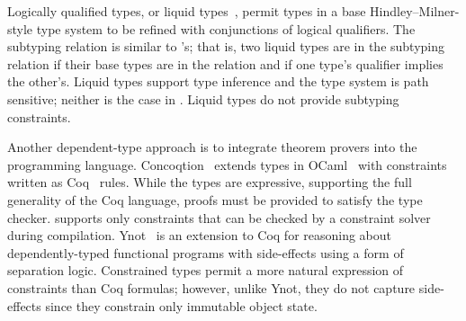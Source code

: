 





Logically qualified types, or liquid types~\cite{liquid-types},
permit types in a base Hindley--Milner-style type system to be refined with
conjunctions of logical qualifiers.  The subtyping relation is similar to
\Xten{}'s; that is, two liquid types are in the subtyping relation if their base
types are in the relation and if one type's qualifier implies the other's.
Liquid types support type inference and 
the type system is path sensitive; neither is the case in \Xten.
Liquid types do not provide subtyping constraints.


Another dependent-type approach is to integrate theorem 
provers into the programming language.
Concoqtion~\cite{concoqtion} extends types in OCaml~\cite{ocaml}
with constraints written as Coq~\cite{coq} rules.
While the types are expressive, supporting the full generality
of the Coq language, proofs must be
provided to satisfy the type checker.
\Xten{} supports only constraints that can be checked by a
constraint solver during compilation.
Ynot~\cite{ynot} is an extension to Coq for reasoning about 
dependently-typed functional programs with side-effects using a
form of separation logic.
Constrained types permit a more natural expression of constraints
than Coq formulas; however, unlike Ynot, they do not capture
side-effects since they constrain
only immutable object state.

